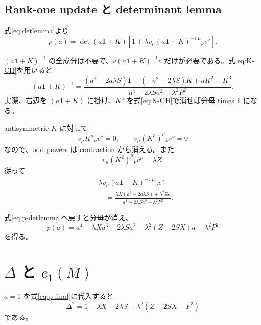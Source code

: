 \documentclass[a4paper,11pt]{ltjsreport}
\newcommand{\Id}{\mathbf 1}
\begin{document}
\subsection{Rank-one update と determinant lemma}

式\eqref{eq:detlemma}より
\begin{equation}
 p(a)
 =\det(a\Id+K)
 \left[1+\lambda v_\mu(a\Id+K)^{-1\,\mu}{}_{\nu}v^\nu\right].
 \label{eq:p-detlemma}
\end{equation}

$(a\Id+K)^{-1}$ の全成分は不要で、$v(a\Id+K)^{-1}v$ だけが必要である。式\eqref{eq:K-CH}を用いると
\begin{equation}
 (a\Id+K)^{-1}
 =\frac{(a^3-2a\lambda S)\Id+(-a^2+2\lambda S)K+aK^2-K^3}
 {a^4-2\lambda Sa^2-\lambda^2P^2}.
 \label{eq:aK-inverse}
\end{equation}
実際、右辺を $(a\Id+K)$ に掛け、$K^4$ を式\eqref{eq:K-CH}で消せば分母 times $\Id$ になる。

antisymmetric $K$ に対して
\begin{equation}
 v_\mu K^\mu{}_{\nu}v^\nu=0,
 \qquad
 v_\mu(K^3)^\mu{}_{\nu}v^\nu=0
 \label{eq:odd-contractions}
\end{equation}
なので、odd powers は contraction から消える。また
\begin{equation}
 v_\mu(K^2)^\mu{}_{\nu}v^\nu
 =\lambda Z.
\end{equation}
従って
\begin{align}
 &\lambda v_\mu(a\Id+K)^{-1\,\mu}{}_{\nu}v^\nu\nonumber\\
 &\quad=\frac{\lambda X(a^3-2a\lambda S)+\lambda^2Za}
 {a^4-2\lambda Sa^2-\lambda^2P^2}.
 \label{eq:rank-one-contraction}
\end{align}

式\eqref{eq:p-detlemma}へ戻すと分母が消え、
\begin{equation}
 p(a)=a^4+\lambda Xa^3-2\lambda Sa^2
 +\lambda^2(Z-2SX)a-\lambda^2P^2
 \label{eq:p-final}
\end{equation}
を得る。

\section{\texorpdfstring{$\Delta$ と $e_1(M)$}{Delta and e1(M)}}

$a=1$ を式\eqref{eq:p-final}に代入すると
\begin{equation}
 \Delta^2
 =1+\lambda X-2\lambda S
 +\lambda^2(Z-2SX-P^2)
 \label{eq:Delta-field}
\end{equation}
である。
\end{document}
